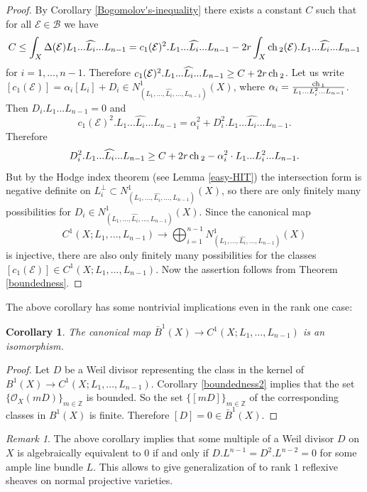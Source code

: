 \documentclass[12pt]{article}
\theoremstyle{plain}
\newtheorem{Corollary}[Thm]{\sc Corollary}
\theoremstyle{definition}
\theoremstyle{remark}
\newtheorem{Remark}[Thm]{Remark}
\newcommand{\ZZ}{{\mathbb Z}}
\newcommand{\cB}{{\mathcal B}}
\newcommand{\cE}{{\mathcal E}}
\newcommand{\cO}{{\mathcal O}}
\newcommand{\ch}{{\mathop{\rm ch \, }}}
\begin{document}
\begin{proof}
By Corollary \ref{Bogomolov's-inequality} there exists a constant $C$ 
such that for all  $\cE \in \cB$ we have
$$C\le \int _X \Delta (\cE) L_1...\widehat{L_i}...L_{n-1}=  c_1 (\cE)^2.L_1...\widehat{L_i}...L_{n-1} - 2r \int _X \ch_2 (\cE). L_1...\widehat{L_i}...L_{n-1} $$
for $i=1,...,n-1$.
Therefore $c_1 (\cE)^2.L_1...\widehat{L_i}...L_{n-1}\ge C+2r \,\ch _2$. Let us write $[c_1(\cE)]=\alpha _i [L_i]+D_i\in N^1_{(L_1,...,\widehat{L_i},...,L_{n-1})}(X)$, where $\alpha _i= \frac{\ch _1}{L_1...L_i^2...L_{n-1}}$.
Then $D_i.L_1...L_{n-1}=0$ and 
$$c_1 (\cE)^2.L_1...\widehat{L_i}...L_{n-1}=\alpha _i^2 +D_i^2.L_1...\widehat{L_i}...L_{n-1}.$$ 
Therefore
$$D^2_i.L_1...\widehat{L_i}...L_{n-1}\ge C+2r \,\ch _2 - \alpha _i ^2\cdot L_1...L_i^2...L_{n-1}.$$
But by the Hodge index theorem (see Lemma \ref{easy-HIT}) the intersection form is negative definite on $L_i^{\perp}\subset N^1_{(L_1,...,\widehat{L_i},...,L_{n-1})}(X)$, so there are only finitely many possibilities for $D_i\in N^1_{(L_1,...,\widehat{L_i},...,L_{n-1})}(X)$.
Since the canonical map 
$$C^1(X;L_1,...,L_{n-1})\to \bigoplus _{i=1}^{n-1} N^1_{(L_1,...,\widehat{L_i},...,L_{n-1})}(X)$$
is injective, there are also only finitely many possibilities for the classes $[c_1(\cE)]\in C^1(X;L_1,...,L_{n-1})$. Now the assertion follows from Theorem \ref{boundedness}.
\end{proof}

The above corollary has some nontrivial implications even in the rank one case:

\begin{Corollary}
The canonical map $\bar B^1(X)\to C^1(X;L_1,...,L_{n-1})$ is an isomorphism.
\end{Corollary}

\begin{proof}
Let $D$ be a Weil divisor representing the class in the kernel of $B^1(X)\to C^1(X;L_1,...,L_{n-1})$.  Corollary \ref{boundedness2} implies that the set $\{ \cO_X(mD)\}_{m\in \ZZ}$ is bounded. So
the set $\{ [mD] \} _{m\in \ZZ}$ of the corresponding classes in $B^1(X)$ is finite. Therefore  $[D]=0\in \bar B^1(X)$. 
\end{proof}

\begin{Remark}
The above corollary implies that some multiple of a Weil divisor $D$ on $X$ is algebraically equivalent to $0$
if and only if $D.L^{n-1}=D^2.L^{n-2}=0$ for some ample line bundle $L$. This allows to
give generalization of \cite[Theorem 9.6.3]{Kl} to rank $1$ reflexive sheaves  on normal projective varieties.	
\end{Remark} 
\end{document}
